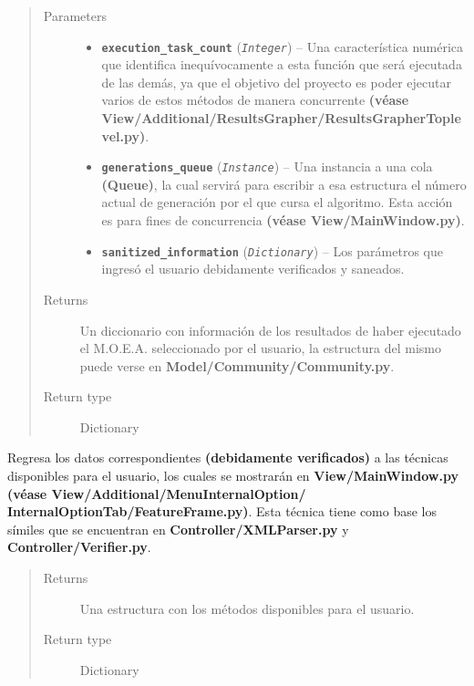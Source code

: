 \documentclass[class=report, crop=false]{standalone}
\begin{document}
\begin{fulllineitems}
\begin{fulllineitems}
\begin{quote}\begin{description}
\item[{Parameters}] \leavevmode\begin{itemize}
\item \textbf{\texttt{execution\_task\_count}} (\emph{\texttt{Integer}}) -- Una característica numérica que identifica inequívocamente a esta función que será ejecutada de las demás, ya que el objetivo del proyecto es poder ejecutar varios de estos métodos de manera concurrente \textbf{(véase View/Additional/}\break\textbf{ResultsGrapher/ResultsGrapherToplevel.py)}.
\item \textbf{\texttt{generations\_queue}} (\emph{\texttt{Instance}}) -- Una instancia a una cola \textbf{(Queue)}, la cual servirá para escribir a esa estructura el número actual de generación por el que cursa el algoritmo. Esta acción es para fines de  concurrencia \textbf{(véase View/MainWindow.py)}.
\item \textbf{\texttt{sanitized\_information}} (\emph{\texttt{Dictionary}}) -- Los parámetros que ingresó el usuario debidamente verificados y saneados.
\end{itemize}
\item[{Returns}] \leavevmode
Un diccionario con información de los resultados de haber ejecutado el M.O.E.A. seleccionado por el usuario, la estructura del mismo puede verse en \textbf{Model/Community/}\break\textbf{Community.py}.
\item[{Return type}] \leavevmode
Dictionary
\end{description}\end{quote}

\end{fulllineitems}

\begin{fulllineitems}

Regresa los datos correspondientes \textbf{(debidamente verificados)}
a las \break técnicas disponibles para el usuario, los cuales se mostrarán en \break 
\textbf{View/MainWindow.py} \textbf{(véase View/Additional/MenuInternalOption/}\break
\textbf{InternalOptionTab/FeatureFrame.py)}.\break
Esta técnica tiene como base los símiles que se encuentran en 
\textbf{Controller/}\break\textbf{XMLParser.py} y \textbf{Controller/Verifier.py}.

\begin{quote}\begin{description}
\item[{Returns}] \leavevmode
Una estructura con los métodos disponibles para el usuario.
\item[{Return type}] \leavevmode
Dictionary
\end{description}\end{quote}


\end{fulllineitems}
\end{fulllineitems}
\end{document}
